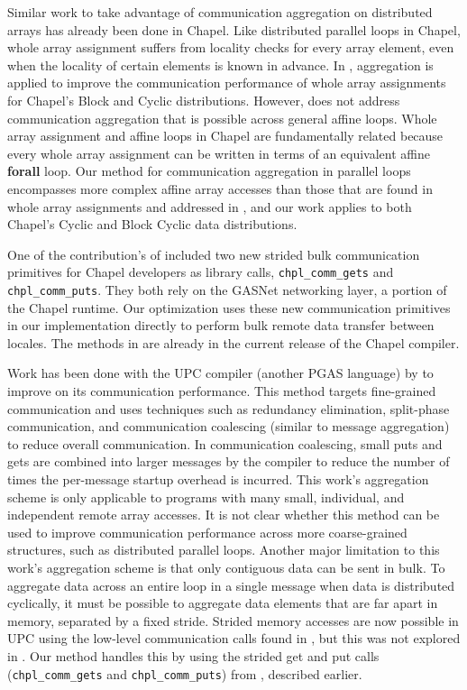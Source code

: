 Similar work to take advantage of communication aggregation on distributed arrays has already been done in Chapel. Like distributed parallel loops in Chapel, whole array assignment suffers from locality checks for every array element, even when the locality of certain elements is known in advance. In \cite{sanz2012global}, aggregation is applied to improve the communication performance of whole array assignments for Chapel's Block and Cyclic distributions. However, \cite{sanz2012global} does not address communication aggregation that is possible across general affine loops. Whole array assignment and affine loops in Chapel are fundamentally related because every whole array assignment can be written in terms of an equivalent affine \textbf{forall} loop. Our method for communication aggregation in parallel loops encompasses more complex affine array accesses than those that are found in whole array assignments and addressed in \cite{sanz2012global}, and our work applies to both Chapel's Cyclic and Block Cyclic data distributions.  

One of the contribution's of \cite{sanz2012global} included two new strided bulk communication primitives for Chapel developers as library calls, \texttt{chpl\_comm\_gets} and \texttt{chpl\_comm\_puts}. They both rely on the GASNet networking layer, a portion of the Chapel runtime.  Our optimization uses these new communication primitives in our implementation directly to perform bulk remote data transfer between locales. The methods in \cite{sanz2012global} are already in the current release of the Chapel compiler. 

Work has been done with the UPC compiler (another PGAS language) by \cite{chen2005communication} to improve on its communication performance. This method targets fine-grained communication and uses techniques such as redundancy elimination, split-phase communication, and communication coalescing (similar to message aggregation) to reduce overall communication. In communication coalescing, small puts and gets are combined into larger messages by the compiler to reduce the number of times the per-message startup overhead is incurred. This work's aggregation scheme is only applicable to programs with many small, individual, and independent remote array accesses. It is not clear whether this method can be used to improve communication performance across more coarse-grained structures, such as distributed parallel loops. Another major limitation to this work's aggregation scheme is that only contiguous data can be sent in bulk. To aggregate data across an entire loop in a single message when data is distributed cyclically, it must be possible to aggregate data elements that are far apart in memory, separated by a fixed stride. Strided memory accesses are now possible in UPC using the low-level communication calls found in \cite{bonachea2007proposal}, but this was not explored in \cite{chen2005communication}. Our method handles this by using the strided get and put calls (\texttt{chpl\_comm\_gets} and \texttt{chpl\_comm\_puts}) from \cite{sanz2012global}, described earlier. 

